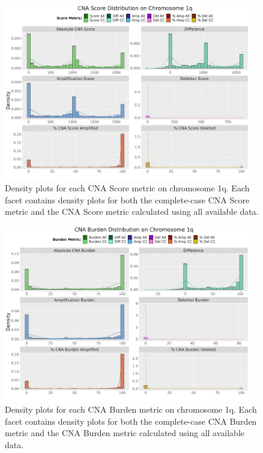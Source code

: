 \begin{figure}[!ht]
\center
\includegraphics[width = 0.96\textwidth]{../figures/Chapter_2/CNA_Score_Comparative_Density_Chr1q.png}
\caption[Density plots for each CNA Score metric on chromosome 1q.]{Density plots for each CNA Score metric on chromosome 1q. Each facet contains density plots for both the complete-case CNA Score metric and the CNA Score metric calculated using all available data.}
\label{fig:Score_Comp_Dense_Chr1q}
\end{figure}

\begin{figure}[!ht]
\center
\includegraphics[width = 0.96\textwidth]{../figures/Chapter_2/CNA_Burden_Comparative_Density_Chr1q.png}
\caption[Density plots for each CNA Burden metric on chromosome 1q.]{Density plots for each CNA Burden metric on chromosome 1q. Each facet contains density plots for both the complete-case CNA Burden metric and the CNA Burden metric calculated using all available data.}
\label{fig:Burden_Comp_Dense_Chr1q}
\end{figure}
\clearpage 

